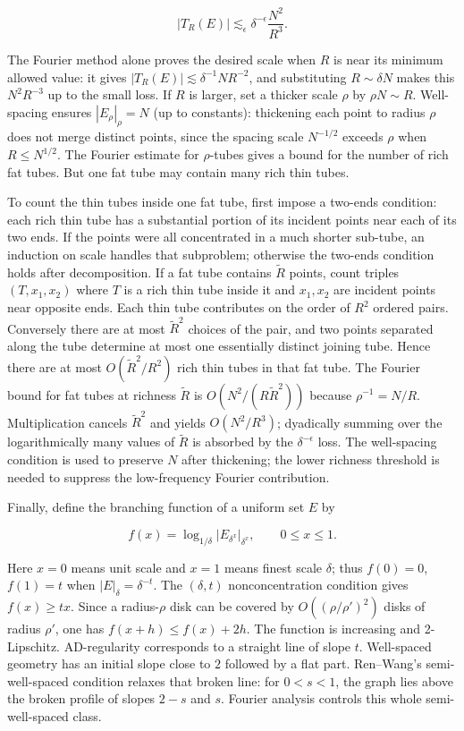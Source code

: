 \[|T_R(E)|\lesssim_\epsilon \delta^{-\epsilon}\frac{N^2}{R^3}.\]

The Fourier method alone proves the desired scale when \(R\) is near its minimum allowed value: it gives \(|T_R(E)|\lesssim\delta^{-1}NR^{-2}\), and substituting \(R\sim\delta N\) makes this \(N^2R^{-3}\) up to the small loss. If \(R\) is larger, set a thicker scale \(\rho\) by \(\rho N\sim R\). Well-spacing ensures \(|E_\rho|_\rho=N\) (up to constants): thickening each point to radius \(\rho\) does not merge distinct points, since the spacing scale \(N^{-1/2}\) exceeds \(\rho\) when \(R\le N^{1/2}\). The Fourier estimate for \(\rho\)-tubes gives a bound for the number of rich fat tubes. But one fat tube may contain many rich thin tubes.

To count the thin tubes inside one fat tube, first impose a two-ends condition: each rich thin tube has a substantial portion of its incident points near each of its two ends. If the points were all concentrated in a much shorter sub-tube, an induction on scale handles that subproblem; otherwise the two-ends condition holds after decomposition. If a fat tube contains \(\widetilde R\) points, count triples \((T,x_1,x_2)\) where \(T\) is a rich thin tube inside it and \(x_1,x_2\) are incident points near opposite ends. Each thin tube contributes on the order of \(R^2\) ordered pairs. Conversely there are at most \(\widetilde R^2\) choices of the pair, and two points separated along the tube determine at most one essentially distinct joining tube. Hence there are at most \(O(\widetilde R^2/R^2)\) rich thin tubes in that fat tube. The Fourier bound for fat tubes at richness \(\widetilde R\) is \(O(N^2/(R\widetilde R^2))\) because \(\rho^{-1}=N/R\). Multiplication cancels \(\widetilde R^2\) and yields \(O(N^2/R^3)\); dyadically summing over the logarithmically many values of \(\widetilde R\) is absorbed by the \(\delta^{-\epsilon}\) loss. The well-spacing condition is used to preserve \(N\) after thickening; the lower richness threshold is needed to suppress the low-frequency Fourier contribution.

Finally, define the branching function of a uniform set \(E\) by

\[f(x)=\log_{1/\delta}|E_{\delta^x}|_{\delta^x},\qquad 0\le x\le1.\]

Here \(x=0\) means unit scale and \(x=1\) means finest scale \(\delta\); thus \(f(0)=0\), \(f(1)=t\) when \(|E|_\delta=\delta^{-t}\). The \((\delta,t)\) nonconcentration condition gives \(f(x)\ge tx\). Since a radius-\(\rho\) disk can be covered by \(O((\rho/\rho')^2)\) disks of radius \(\rho'\), one has \(f(x+h)\le f(x)+2h\). The function is increasing and 2-Lipschitz. AD-regularity corresponds to a straight line of slope \(t\). Well-spaced geometry has an initial slope close to \(2\) followed by a flat part. Ren--Wang's semi-well-spaced condition relaxes that broken line: for \(0<s<1\), the graph lies above the broken profile of slopes \(2-s\) and \(s\). Fourier analysis controls this whole semi-well-spaced class.

